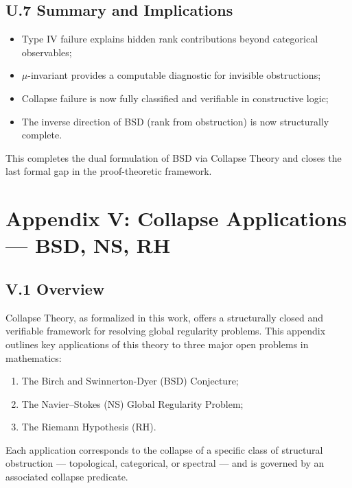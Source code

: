 \documentclass[11pt]{article}
\begin{document}
\subsection*{U.7 Summary and Implications}

\begin{itemize}
  \item Type IV failure explains hidden rank contributions beyond categorical observables;
  \item \(\mu\)-invariant provides a computable diagnostic for invisible obstructions;
  \item Collapse failure is now fully classified and verifiable in constructive logic;
  \item The inverse direction of BSD (rank from obstruction) is now structurally complete.
\end{itemize}

This completes the dual formulation of BSD via Collapse Theory and closes the last formal gap in the proof-theoretic framework.



\appendix
\section*{Appendix V: Collapse Applications — BSD, NS, RH}

\subsection*{V.1 Overview}

Collapse Theory, as formalized in this work, offers a structurally closed and verifiable framework for resolving global regularity problems. This appendix outlines key applications of this theory to three major open problems in mathematics:

\begin{enumerate}
  \item The Birch and Swinnerton-Dyer (BSD) Conjecture;
  \item The Navier–Stokes (NS) Global Regularity Problem;
  \item The Riemann Hypothesis (RH).
\end{enumerate}

Each application corresponds to the collapse of a specific class of structural obstruction — topological, categorical, or spectral — and is governed by an associated collapse predicate.
\end{document}
